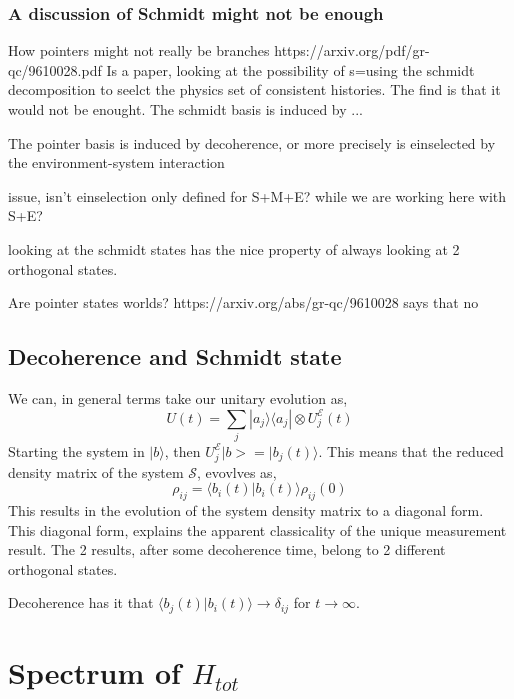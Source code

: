 \documentclass{article}
\begin{document}
\subsubsection{A discussion of Schmidt might not be enough}
How pointers might not really be branches https://arxiv.org/pdf/gr-qc/9610028.pdf
Is a paper, looking at the possibility of s=using the schmidt decomposition to seelct the physics set of consistent histories. The find is that it would not be enought.
The schmidt basis is induced by ...

The pointer basis is induced by decoherence, or more precisely is einselected by the environment-system interaction

issue, isn't einselection only defined for S+M+E? while we are working here with S+E?

looking at the schmidt states has the nice property of always looking at 2 orthogonal states.

Are pointer states worlds? https://arxiv.org/abs/gr-qc/9610028 says that no

\subsection{Decoherence and Schmidt state}


We can, in general terms take our unitary evolution as,
\begin{equation}
    U(t)=\sum_j|a_j\rangle\langle a_j|\otimes U^{\mathcal{E}}_j(t)
\end{equation}
Starting the system in $|b\rangle$, then $U_j^{\mathcal{E}}|b>=|b_j(t)\rangle$. This means that the reduced density matrix of the system $\mathcal{S}$, evovlves as,
\begin{equation}
    \rho_{ij} = \langle b_i(t)|b_i(t)\rangle \rho_{ij}(0)
\end{equation}
This results in the evolution of the system density matrix to a diagonal form. This diagonal form, explains the apparent classicality of the unique measurement result. The 2 results, after some decoherence time, belong to 2 different orthogonal states. 


Decoherence has it that $\langle b_j(t)|b_i(t)\rangle\rightarrow \delta_{ij}$ for $t\rightarrow \infty$. 

\appendix

\section{Spectrum of $H_{tot}$}
\end{document}
